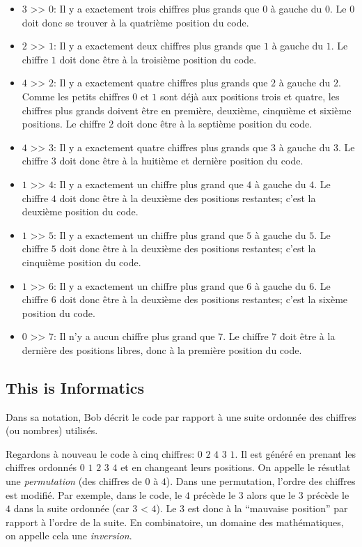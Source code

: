 \documentclass[a4paper,11pt]{report}
\begin{document}
\begin{itemize}
  \item $3$ >\textcompwordmark{}> $0$:  Il y a exactement trois chiffres plus grands que $0$ à gauche du $0$. Le $0$ doit donc se trouver à la quatrième position du code.
  \item $2$ >\textcompwordmark{}> $1$:  Il y a exactement deux chiffres plus grands que $1$ à gauche du $1$. Le chiffre $1$ doit donc être à la troisième position du code.
  \item $4$ >\textcompwordmark{}> $2$:  Il y a exactement quatre chiffres plus grands que $2$ à gauche du $2$. Comme les petits chiffres $0$ et $1$ sont déjà aux positions trois et quatre, les chiffres plus grands doivent être en première, deuxième, cinquième et sixième positions. Le chiffre $2$ doit donc être à la septième position du code.
  \item $4$ >\textcompwordmark{}> $3$:  Il y a exactement quatre chiffres plus grands que $3$ à gauche du $3$. Le chiffre $3$ doit donc être à la huitième et dernière position du code.
  \item $1$ >\textcompwordmark{}> $4$:  Il y a exactement un chiffre plus grand que $4$ à gauche du $4$. Le chiffre $4$ doit donc être à la deuxième des positions restantes; c’est la deuxième position du code.
  \item $1$ >\textcompwordmark{}> $5$:  Il y a exactement un chiffre plus grand que $5$ à gauche du $5$. Le chiffre $5$ doit donc être à la deuxième des positions restantes; c’est la cinquième position du code.
  \item $1$ >\textcompwordmark{}> $6$:  Il y a exactement un chiffre plus grand que $6$ à gauche du $6$. Le chiffre $6$ doit donc être à la deuxième des positions restantes; c’est la sixème position du code.
  \item $0$ >\textcompwordmark{}> $7$:  Il n’y a aucun chiffre plus grand que $7$. Le chiffre $7$ doit être à la dernière des positions libres, donc à la première position du code.
\end{itemize}


\subsection*{This is Informatics}

Dans sa notation, Bob décrit le code par rapport à une suite ordonnée des chiffres (ou nombres) utilisés.

Regardons à nouveau le code à cinq chiffres: $0$ $2$ $4$ $3$ $1$. Il est généré en prenant les chiffres ordonnés $0$ $1$ $2$ $3$ $4$ et en changeant leurs positions. On appelle le résutlat une \emph{permutation} (des chiffres de $0$ à $4$). Dans une permutation, l’ordre des chiffres est modifié. Par exemple, dans le code, le $4$ précède le $3$ alors que le $3$ précède le $4$ dans la suite ordonnée (car $3$ < $4$). Le $3$ est donc à la “mauvaise position” par rapport à l’ordre de la suite. En combinatoire, un domaine des mathématiques, on appelle cela une \emph{inversion}.
\end{document}
